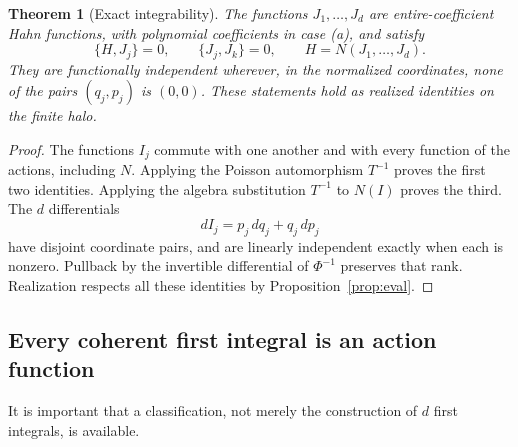 \documentclass[11pt,letterpaper]{article}
\numberwithin{equation}{section}
\newtheorem{theorem}{Theorem}[section]
\theoremstyle{definition}
\theoremstyle{remark}
\begin{document}
\begin{theorem}[Exact integrability]\label{thm:integrability}
The functions $J_1,\ldots,J_d$ are entire-coefficient Hahn functions, with
polynomial coefficients in case (a), and satisfy
\begin{equation}\label{eq:integrals}
 \{H,J_j\}=0,\qquad \{J_j,J_k\}=0,\qquad H=N(J_1,\ldots,J_d).
\end{equation}
They are functionally independent wherever, in the normalized coordinates,
none of the pairs $(q_j,p_j)$ is $(0,0)$. These statements hold as realized
identities on the finite halo.
\end{theorem}
\begin{proof}
The functions $I_j$ commute with one another and with every function of the
actions, including $N$. Applying the Poisson automorphism $T^{-1}$ proves
the first two identities. Applying the algebra substitution $T^{-1}$ to
$N(I)$ proves the third. The $d$ differentials
\[
 dI_j=p_j\,dq_j+q_j\,dp_j
\]
have disjoint coordinate pairs, and are linearly independent exactly when
each is nonzero. Pullback by the invertible differential of $\Phi^{-1}$
preserves that rank. Realization respects all these identities by
Proposition~\ref{prop:eval}.
\end{proof}

\subsection{Every coherent first integral is an action function}
It is important that a classification, not merely the construction of $d$
first integrals, is available.
\end{document}
